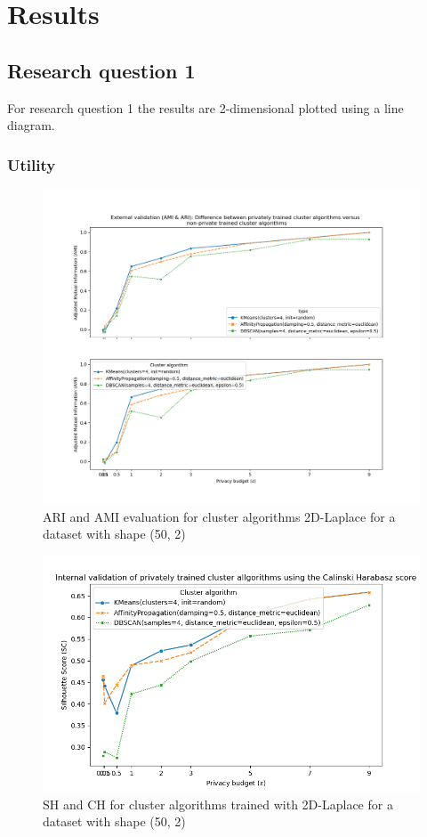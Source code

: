 \section{Results}
\subsection{Research question 1}
For research question 1 the results are 2-dimensional plotted using a line diagram.

\subsubsection{Utility}
\begin{figure}[!htb]
  \includegraphics[width=1\linewidth]{Results/rq1/ami-and-ari.png}
  \caption{ARI and AMI evaluation for cluster algorithms 2D-Laplace for a dataset with shape (50, 2)}
\end{figure}
\begin{figure}[!htb]
  \includegraphics[width=1\linewidth]{Results/rq1/sc.png}
  \caption{SH and CH for cluster algorithms trained with 2D-Laplace for a dataset with shape (50, 2)}
\end{figure}
\newpage
